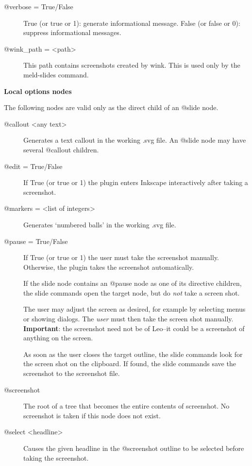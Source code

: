 \documentclass[a4paper,10pt,english]{sphinxmanual}
\begin{document}
\begin{description}
\item[{@verbose = True/False}] \leavevmode
True (or true or 1):  generate informational message.
False (or false or 0): suppress informational messages.

\item[{@wink\_path = \textless{}path\textgreater{}}] \leavevmode
This path contains screenshots created by wink.
This is used only by the meld-slides command.

\end{description}

\textbf{Local options nodes}

The following nodes are valid only as the direct
child of an @slide node.
\begin{description}
\item[{@callout \textless{}any text\textgreater{}}] \leavevmode
Generates a text callout in the working .svg file.
An @slide node may have several @callout children.

\item[{@edit = True/False}] \leavevmode
If True (or true or 1) the plugin enters
Inkscape interactively after taking a
screenshot.

\item[{@markers = \textless{}list of integers\textgreater{}}] \leavevmode
Generates `numbered balls' in the working .svg file.

\item[{@pause = True/False}] \leavevmode
If True (or true or 1) the user must take the
screenshot manually. Otherwise, the plugin takes
the screenshot automatically.

If the slide node contains an @pause node as one
of its directive children, the slide commands
open the target node, but do \emph{not} take a screen
shot.

The user may adjust the screen as desired, for
example by selecting menus or showing dialogs.
The \emph{user} must then take the screen shot
manually. \textbf{Important}: the screenshot need not
be of Leo--it could be a screenshot of anything
on the screen.

As soon as the user closes the target
outline, the slide commands look for the screen
shot on the clipboard. If found, the slide
commands save the screenshot to the screenshot
file.

\item[{@screenshot}] \leavevmode
The root of a tree that becomes the entire
contents of screenshot. No screenshot is taken
if this node does not exist.

\item[{@select \textless{}headline\textgreater{}}] \leavevmode
Causes the given headline in the @screenshot
outline to be selected before taking the screenshot.

\end{description}
\end{document}

